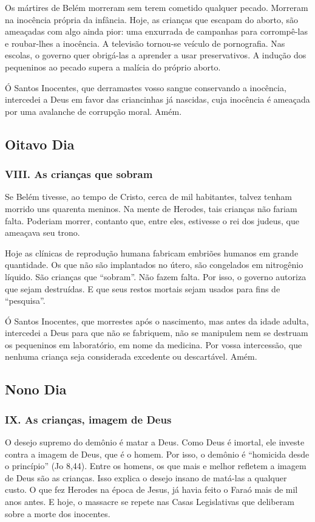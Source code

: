 \documentclass[11pt]{article}
\begin{document}
Os mártires de Belém morreram sem terem cometido qualquer pecado. Morreram na inocência própria da infância. Hoje, as crianças que escapam do aborto, são ameaçadas com algo ainda pior: uma enxurrada de campanhas para corrompê-las e roubar-lhes a inocência. A televisão tornou-se veículo de pornografia. Nas escolas, o governo quer obrigá-las a aprender a usar preservativos. A indução dos pequeninos ao pecado supera a malícia do próprio aborto.

Ó Santos Inocentes, que derramastes vosso sangue conservando a inocência, intercedei a Deus em favor das criancinhas já nascidas, cuja inocência é ameaçada por uma avalanche de corrupção moral. Amém.

\subsection{Oitavo Dia}
\subsubsection*{VIII. As crianças que sobram}

Se Belém tivesse, ao tempo de Cristo, cerca de mil habitantes, talvez tenham morrido uns quarenta meninos. Na mente de Herodes, tais crianças não fariam falta. Poderiam morrer, contanto que, entre eles, estivesse o rei dos judeus, que ameaçava seu trono.

Hoje as clínicas de reprodução humana fabricam embriões humanos em grande quantidade. Os que não são implantados no útero, são congelados em nitrogênio líquido. São crianças que “sobram”. Não fazem falta. Por isso, o governo autoriza que sejam destruídas. E que seus restos mortais sejam usados para fins de “pesquisa”.

Ó Santos Inocentes, que morrestes após o nascimento, mas antes da idade adulta, intercedei a Deus para que não se fabriquem, não se manipulem nem se destruam os pequeninos em laboratório, em nome da medicina. Por vossa intercessão, que nenhuma criança seja considerada excedente ou descartável. Amém.

\subsection{Nono Dia}
\subsubsection*{IX. As crianças, imagem de Deus}

O desejo supremo do demônio é matar a Deus. Como Deus é imortal, ele investe contra a imagem de Deus, que é o homem. Por isso, o demônio é “homicida desde o princípio” (Jo 8,44). Entre os homens, os que mais e melhor refletem a imagem de Deus são as crianças. Isso explica o desejo insano de matá-las a qualquer custo. O que fez Herodes na época de Jesus, já havia feito o Faraó mais de mil anos antes. E hoje, o massacre se repete nas Casas Legislativas que deliberam sobre a morte dos inocentes.
\end{document}
